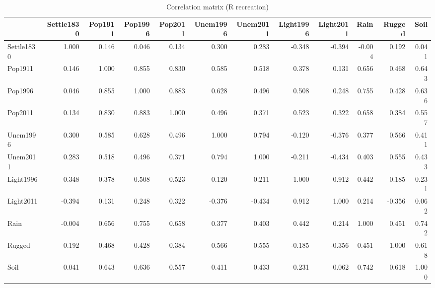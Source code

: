 \begin{table}

\caption{Correlation matrix (R recreation)}
\centering
\begin{tabular}[t]{lrrrrrrrrrrr}
\toprule
  & Settle1830 & Pop1911 & Pop1996 & Pop2011 & Unem1996 & Unem2011 & Light1996 & Light2011 & Rain & Rugged & Soil\\
\midrule
Settle1830 & 1.000 & 0.146 & 0.046 & 0.134 & 0.300 & 0.283 & -0.348 & -0.394 & -0.004 & 0.192 & 0.041\\
Pop1911 & 0.146 & 1.000 & 0.855 & 0.830 & 0.585 & 0.518 & 0.378 & 0.131 & 0.656 & 0.468 & 0.643\\
Pop1996 & 0.046 & 0.855 & 1.000 & 0.883 & 0.628 & 0.496 & 0.508 & 0.248 & 0.755 & 0.428 & 0.636\\
Pop2011 & 0.134 & 0.830 & 0.883 & 1.000 & 0.496 & 0.371 & 0.523 & 0.322 & 0.658 & 0.384 & 0.557\\
Unem1996 & 0.300 & 0.585 & 0.628 & 0.496 & 1.000 & 0.794 & -0.120 & -0.376 & 0.377 & 0.566 & 0.411\\
\addlinespace
Unem2011 & 0.283 & 0.518 & 0.496 & 0.371 & 0.794 & 1.000 & -0.211 & -0.434 & 0.403 & 0.555 & 0.433\\
Light1996 & -0.348 & 0.378 & 0.508 & 0.523 & -0.120 & -0.211 & 1.000 & 0.912 & 0.442 & -0.185 & 0.231\\
Light2011 & -0.394 & 0.131 & 0.248 & 0.322 & -0.376 & -0.434 & 0.912 & 1.000 & 0.214 & -0.356 & 0.062\\
Rain & -0.004 & 0.656 & 0.755 & 0.658 & 0.377 & 0.403 & 0.442 & 0.214 & 1.000 & 0.451 & 0.742\\
Rugged & 0.192 & 0.468 & 0.428 & 0.384 & 0.566 & 0.555 & -0.185 & -0.356 & 0.451 & 1.000 & 0.618\\
\addlinespace
Soil & 0.041 & 0.643 & 0.636 & 0.557 & 0.411 & 0.433 & 0.231 & 0.062 & 0.742 & 0.618 & 1.000\\
\bottomrule
\end{tabular}
\end{table}
